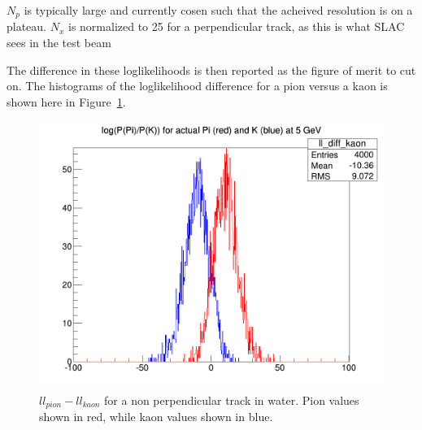 \documentclass[11pt]{article}
\begin{document}
$N_p$ is typically large and currently cosen such that the acheived resolution is on a plateau.  $N_x$ is normalized to 25 for a perpendicular track, as this is what SLAC sees in the test beam

The difference in these loglikelihoods is then reported as the figure of merit to cut on.  The histograms of the loglikelihood difference for a pion versus a kaon is shown here in Figure~\ref{fig:llhistos}.

\begin{figure}
\centering
\caption{$ll_{pion} - ll_{kaon}$ for a non perpendicular track in water.  Pion values shown in red, while kaon values shown in blue. \label{fig:llhistos}}
\includegraphics[width=5in]{pngs/ll_diffs.png}
\end{figure}
\end{document}
